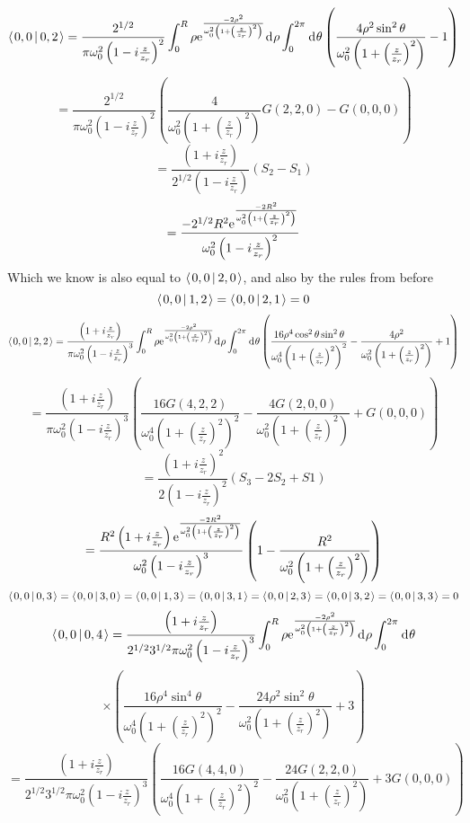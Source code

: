 \documentclass[11pt]{amsart}
\makeatletter
\newcommand{\e}{{\rm e}}				%
\newcommand{\msp}[1]{\mspace{#1mu}}		%
\newcommand{\0}{\varnothing}		%
\newcommand{\dd}{\msp{1} {\rm{d}} \msp{1}}	%
\newcommand{\brac}[2]{\left\langle\msp{2} #1\left\lvert \msp{3.5} #2 \right.\right\rangle}	%
\newcommand{\1}{!}
\newcommand{\2}{@}
\newcommand{\3}{\#}
\newcommand{\4}{\$}
\newcommand{\5}{\%}
\newcommand{\6}{$^\wedge$}
\newcommand{\7}{\&}
\newcommand{\8}{*}
\newcommand{\9}{(}
\makeatother
\begin{document}
\[
\brac{0,0}{0,2} = \frac{2^{1/2}}{\pi\omega_0^2\left(1-i\frac{z}{z_r}\right)^2}\int_0^R \rho \e^{\frac{-2\rho^2}{\omega_0^2\left(1+\left(\frac{z}{z_r}\right)^2\right)}}\dd \rho\int_0^{2\pi} \dd \theta\left(\frac{4\rho^2\sin^2\theta}{\omega_0^2\left(1+\left(\frac{z}{z_r}\right)^2\right)}-1\right)
\]
\[
=\frac{2^{1/2}}{\pi\omega_0^2\left(1-i\frac{z}{z_r}\right)^2}\left(\frac{4}{\omega_0^2\left(1+\left(\frac{z}{z_r}\right)^2\right)}G(2,2,0) - G(0,0,0)\right)
\]
\[
=\frac{\left(1+i\frac{z}{z_r}\right)}{2^{1/2}\left(1-i\frac{z}{z_r}\right)}\left(S_2-S_1\right)
\]
\[
=\frac{-2^{1/2}R^2\e^{\frac{-2R^2}{\omega_0^2\left(1+\left(\frac{z}{z_r}\right)^2\right)}}}{\omega_0^2\left(1-i\frac{z}{z_r}\right)^2}
\]
Which we know is also equal to $\brac{0,0}{2,0}$, and also by the rules from before
\[
\brac{0,0}{1,2} = \brac{0,0}{2,1} = 0
\]
\[
\brac{0,0}{2,2} = \frac{\left(1+i\frac{z}{z_r}\right)}{\pi\omega_0^2\left(1-i\frac{z}{z_r}\right)^3}\int_0^R\rho \e^{\frac{-2\rho^2}{\omega_0^2\left(1+\left(\frac{z}{z_r}\right)^2\right)}} \dd \rho\int_0^{2\pi}\dd \theta \left(\frac{16\rho^4\cos^2\theta \sin^2\theta}{\omega_0^4\left(1+\left(\frac{z}{z_r}\right)^2\right)^2}-\frac{4\rho^2}{\omega_0^2\left(1+\left(\frac{z}{z_r}\right)^2\right)}+1\right)
\]
\[
=\frac{\left(1+i\frac{z}{z_r}\right)}{\pi \omega_0^2\left(1-i\frac{z}{z_r}\right)^3}\left(\frac{16G(4,2,2)}{\omega_0^4\left(1+\left(\frac{z}{z_r}\right)^2\right)^2}-\frac{4G(2,0,0)}{\omega_0^2\left(1+\left(\frac{z}{z_r}\right)^2\right)}+G(0,0,0)\right)
\]
\[
=\frac{\left(1+i\frac{z}{z_r}\right)^2}{2\left(1-i\frac{z}{z_r}\right)^2}\left(S_3-2S_2+S1\right)
\]
\[
=\frac{R^2\left(1+i\frac{z}{z_r}\right)\e^{\frac{-2R^2}{\omega_0^2\left(1+\left(\frac{z}{z_r}\right)^2\right)}}}{\omega_0^2\left(1-i\frac{z}{z_r}\right)^3}\left(1-\frac{R^2}{\omega_0^2\left(1+\left(\frac{z}{z_r}\right)^2\right)}\right)
\]
\[
\brac{0,0}{0,3} = \brac{0,0}{3,0} = \brac{0,0}{1,3} = \brac{0,0}{3,1} = \brac{0,0}{2,3} = \brac{0,0}{3,2} = \brac{0,0}{3,3} = 0
\]
\newpage
\[
\brac{0,0}{0,4} = \frac{\left(1+i\frac{z}{z_r}\right)}{2^{1/2}3^{1/2}\pi\omega_0^2\left(1-i\frac{z}{z_r}\right)^3}\int_0^R\rho \e^{\frac{-2\rho^2}{\omega_0^2\left(1+\left(\frac{z}{z_r}\right)^2\right)}}\dd \rho \int_0^{2\pi}\dd \theta\]
\[
\times\left(\frac{16\rho^4\sin^4\theta}{\omega_0^4\left(1+\left(\frac{z}{z_r}\right)^2\right)^2}-\frac{24\rho^2\sin^2\theta}{\omega_0^2\left(1+\left(\frac{z}{z_r}\right)^2\right)}+3\right)
\]
\[
=\frac{\left(1+i\frac{z}{z_r}\right)}{2^{1/2}3^{1/2}\pi \omega_0^2\left(1-i\frac{z}{z_r}\right)^3}\left(\frac{16G(4,4,0)}{\omega_0^4\left(1+\left(\frac{z}{z_r}\right)^2\right)^2}-\frac{24G(2,2,0)}{\omega_0^2\left(1+\left(\frac{z}{z_r}\right)^2\right)}+3G(0,0,0)\right)
\]
\end{document}
